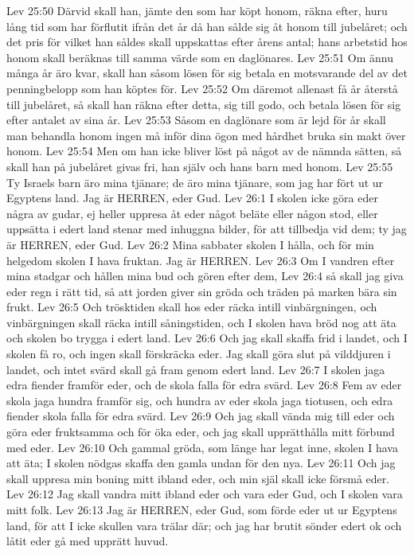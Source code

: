 Lev 25:50  Därvid skall han, jämte den som har köpt honom, räkna efter, huru lång tid som har förflutit ifrån det år då han sålde sig åt honom till jubelåret; och det pris för vilket han såldes skall uppskattas efter årens antal; hans arbetstid hos honom skall beräknas till samma värde som en daglönares.
Lev 25:51  Om ännu många år äro kvar, skall han såsom lösen för sig betala en motsvarande del av det penningbelopp som han köptes för.
Lev 25:52  Om däremot allenast få år återstå till jubelåret, så skall han räkna efter detta, sig till godo, och betala lösen för sig efter antalet av sina år.
Lev 25:53  Såsom en daglönare som är lejd för år skall man behandla honom ingen må inför dina ögon med hårdhet bruka sin makt över honom.
Lev 25:54  Men om han icke bliver löst på något av de nämnda sätten, så skall han på jubelåret givas fri, han själv och hans barn med honom.
Lev 25:55  Ty Israels barn äro mina tjänare; de äro mina tjänare, som jag har fört ut ur Egyptens land. Jag är HERREN, eder Gud.
Lev 26:1  I skolen icke göra eder några av gudar, ej heller uppresa åt eder något beläte eller någon stod, eller uppsätta i edert land stenar med inhuggna bilder, för att tillbedja vid dem; ty jag är HERREN, eder Gud.
Lev 26:2  Mina sabbater skolen I hålla, och för min helgedom skolen I hava fruktan. Jag är HERREN.
Lev 26:3  Om I vandren efter mina stadgar och hållen mina bud och gören efter dem,
Lev 26:4  så skall jag giva eder regn i rätt tid, så att jorden giver sin gröda och träden på marken bära sin frukt.
Lev 26:5  Och trösktiden skall hos eder räcka intill vinbärgningen, och vinbärgningen skall räcka intill såningstiden, och I skolen hava bröd nog att äta och skolen bo trygga i edert land.
Lev 26:6  Och jag skall skaffa frid i landet, och I skolen få ro, och ingen skall förskräcka eder. Jag skall göra slut på vilddjuren i landet, och intet svärd skall gå fram genom edert land.
Lev 26:7  I skolen jaga edra fiender framför eder, och de skola falla för edra svärd.
Lev 26:8  Fem av eder skola jaga hundra framför sig, och hundra av eder skola jaga tiotusen, och edra fiender skola falla för edra svärd.
Lev 26:9  Och jag skall vända mig till eder och göra eder fruktsamma och för öka eder, och jag skall upprätthålla mitt förbund med eder.
Lev 26:10  Och gammal gröda, som länge har legat inne, skolen I hava att äta; I skolen nödgas skaffa den gamla undan för den nya.
Lev 26:11  Och jag skall uppresa min boning mitt ibland eder, och min själ skall icke försmå eder.
Lev 26:12  Jag skall vandra mitt ibland eder och vara eder Gud, och I skolen vara mitt folk.
Lev 26:13  Jag är HERREN, eder Gud, som förde eder ut ur Egyptens land, för att I icke skullen vara trälar där; och jag har brutit sönder edert ok och låtit eder gå med upprätt huvud.
